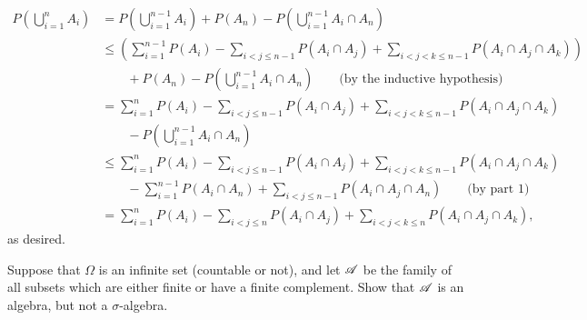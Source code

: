 \begin{solution}
\begin{enumerate}
        \begin{align*}
            P \left( \bigcup_{i = 1}^n A_i \right) &= P \left( \bigcup_{i = 1}^{n - 1} A_i \right) + P(A_n) - P \left( \bigcup_{i = 1}^{n - 1} A_i \cap A_n \right) \\
            & \leq \left( \sum_{i = 1}^{n - 1} P(A_i) - \sum_{i < j \leq n - 1} P(A_i \cap A_j) + \sum_{i < j < k \leq n - 1} P(A_i \cap A_j \cap A_k) \right) 
             \\ 
            & \qquad + P(A_n) - P \left( \bigcup_{i = 1}^{n - 1} A_i \cap A_n \right) \qquad \text{(by the inductive hypothesis)}\\
            &= \sum_{i = 1}^n P(A_i) - \sum_{i < j \leq n - 1} P(A_i \cap A_j) + \sum_{i < j < k \leq n - 1} P(A_i \cap A_j \cap A_k) \\
            & \qquad - P \left( \bigcup_{i = 1}^{n - 1} A_i \cap A_n \right) \\
            & \leq \sum_{i = 1}^n P(A_i) - \sum_{i < j \leq n - 1} P(A_i \cap A_j) + \sum_{i < j < k \leq n - 1} P(A_i \cap A_j \cap A_k) \\
            & \qquad - \sum_{i = 1}^{n - 1} P(A_i \cap A_n) +  \sum_{i < j \leq n - 1} P(A_i \cap A_j \cap A_n) \qquad \text{(by part 1)} \\            
            &= \sum_{i = 1}^n P(A_i) - \sum_{i < j \leq n} P(A_i \cap A_j) + \sum_{i < j < k \leq n} P(A_i \cap A_j \cap A_k),
        \end{align*}
        as desired.

    \end{enumerate} 
\end{solution}


\begin{problem}
Suppose that $\Omega$ is an infinite set (countable or not), and let $\mathscr{A}$ be the family of all subsets which are either finite or have a finite complement. Show that $\mathscr{A}$ is an algebra, but not a $\sigma$-algebra.
\end{problem}

